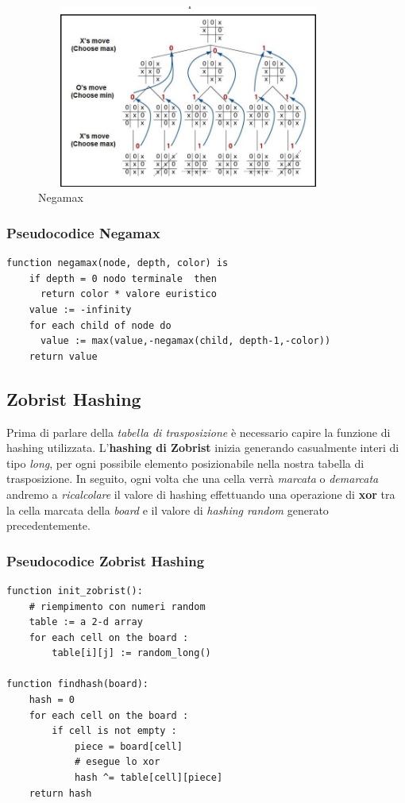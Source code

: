 \documentclass{article}
\begin{document}
    \begin{figure}[h!]
    \centering
    \includegraphics[width=10cm,height=6cm]{img/test.png}
    \caption{Negamax}
    \label{fig:universe}
    \end{figure}
   \subsubsection{Pseudocodice Negamax} 
    \lstset{language=java, numbers=left,numbersep=8pt,  }
    \begin{lstlisting}[frame=single]  
 function negamax(node, depth, color) is
    if depth = 0 nodo terminale  then
      return color * valore euristico
    value := -infinity
    for each child of node do
      value := max(value,-negamax(child, depth-1,-color)) 
    return value
    \end{lstlisting}
    
    
    
    
    \subsection{Zobrist Hashing}
    Prima di parlare della \textit{tabella di trasposizione} è necessario capire la funzione di hashing utilizzata.
    L'\textbf{hashing di Zobrist} \cite{zobrist} inizia generando casualmente interi di tipo \textit{long}, per ogni possibile elemento posizionabile nella nostra tabella di trasposizione. In seguito, ogni volta che una cella verrà \textit{marcata} o \textit{demarcata} andremo a \textit{ricalcolare} il valore di hashing effettuando una operazione di \textbf{xor} tra la cella marcata della \textit{board} e il valore di \textit{hashing random} generato precedentemente. 
    
    \subsubsection{Pseudocodice Zobrist Hashing}
    \lstset{language=java, numbers=left,numbersep=8pt,  }
    \begin{lstlisting}[frame=single]  
function init_zobrist():
    # riempimento con numeri random
    table := a 2-d array  
    for each cell on the board :
        table[i][j] := random_long()

function findhash(board):
    hash = 0
    for each cell on the board :
        if cell is not empty :
            piece = board[cell]
            # esegue lo xor
            hash ^= table[cell][piece]
    return hash
    \end{lstlisting}
    
\end{document}
